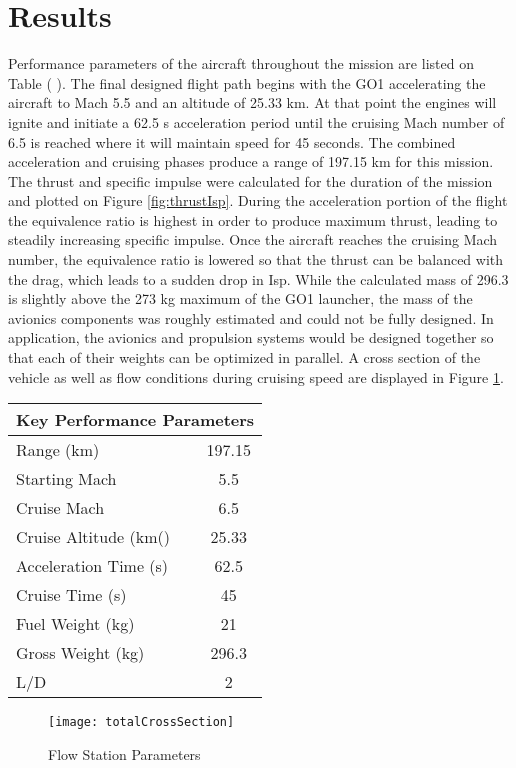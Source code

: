 \section{Results}

 Performance parameters of the aircraft throughout the mission are listed on Table ( ). The final designed flight path begins with the GO1 accelerating the aircraft to Mach 5.5 and an altitude of 25.33 km. At that point the engines will ignite and initiate a 62.5 s acceleration period until the cruising Mach number of 6.5 is reached where it will maintain speed for 45 seconds. The combined acceleration and cruising phases produce a range of 197.15 km for this mission. The thrust and specific impulse were calculated for the duration of the mission and plotted on Figure \ref{fig:thrustIsp}. During the acceleration portion of the flight the equivalence ratio is highest in order to produce maximum thrust, leading to steadily increasing specific impulse. Once the aircraft reaches the cruising Mach number, the equivalence ratio is lowered so that the thrust can be balanced with the drag, which leads to a sudden drop in Isp. While the calculated mass of 296.3 is slightly above the 273 kg maximum of the GO1 launcher, the mass of the avionics components was roughly estimated and could not be fully designed. In application, the avionics and propulsion systems would be designed together so that each of their weights can be optimized in parallel. A cross section of the vehicle as well as flow conditions during cruising speed are displayed in Figure \ref{fig:totalCrossSection}.

\begin{center}
\begin{tabular}{l c}
\multicolumn{2}{c}{\textbf{Key Performance Parameters}} \\
\hline
Range (km) & 197.15 \\
Starting Mach & 5.5 \\
Cruise Mach & 6.5 \\
Cruise Altitude (km()& 25.33 \\
Acceleration Time (s) & 62.5 \\
Cruise Time (s) & 45 \\
Fuel Weight (kg) & 21 \\
Gross Weight (kg) & 296.3 \\
L/D & 2
\end{tabular}
\end{center}

\begin{figure}[H]
\begin{center}
\texttt{[image: totalCrossSection]}
\caption{Flow Station Parameters}
\label{fig:totalCrossSection}
\end{center}
\end{figure}

